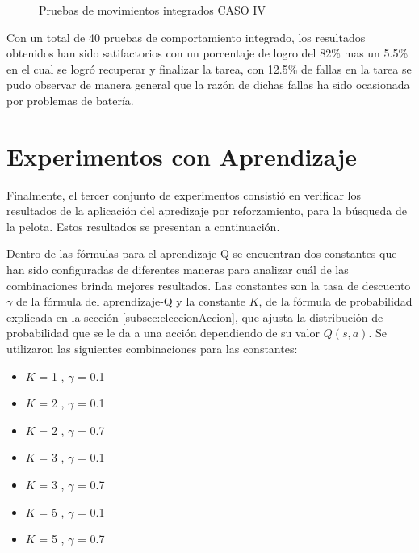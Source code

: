\begin{figure}
\caption{Pruebas de movimientos integrados CASO IV}
\label{fig:caso4}
\end{figure} 

Con un total de 40 pruebas de comportamiento integrado, los resultados obtenidos han sido satifactorios con un porcentaje de logro del 82\% mas un 5.5\% en el cual se logró recuperar y finalizar la tarea, con 12.5\% de fallas en la tarea se pudo observar de manera general que la razón de dichas fallas ha sido ocasionada por problemas de batería.
 

\section{Experimentos con Aprendizaje}\label{sec:experimentosAprend}

Finalmente, el tercer conjunto de experimentos consistió en verificar los resultados de la aplicaci\'on del apredizaje por reforzamiento, para la búsqueda de la pelota. Estos resultados se presentan a continuaci\'on.

Dentro de las fórmulas para el aprendizaje-Q se encuentran dos constantes que han sido configuradas de diferentes maneras para analizar cuál de las combinaciones brinda mejores resultados. Las constantes son la tasa de descuento $\gamma$ de la fórmula del aprendizaje-Q y la constante $K$, de la fórmula de probabilidad explicada en la secci\'on \ref{subsec:eleccionAccion}, que ajusta la distribución de probabilidad que se le da a una acción dependiendo de su valor $Q(s,a)$. Se utilizaron las siguientes combinaciones para las constantes:

\begin{itemize}
\item $K$ = 1 , $\gamma$ = 0.1
\item $K$ = 2 , $\gamma$ = 0.1 
\item $K$ = 2 , $\gamma$ = 0.7
\item $K$ = 3 , $\gamma$ = 0.1
\item $K$ = 3 , $\gamma$ = 0.7
\item $K$ = 5 , $\gamma$ = 0.1
\item $K$ = 5 , $\gamma$ = 0.7
   
\end{itemize}

